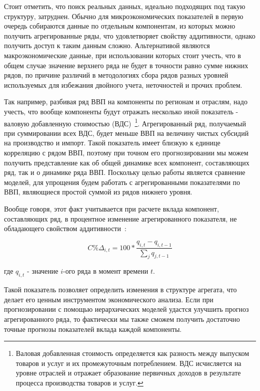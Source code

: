 \documentclass[12pt,a4paper, oneside]{extreport}
\begin{document}
Стоит отметить, что поиск реальных данных, идеально подходящих под такую структуру, затруднен. Обычно для микроэкономических показателей  в первую очередь собираются данные по отдельным компонентам, из которых  можно получить агрегированные ряды, что удовлетворяет свойству аддитивности, однако получить доступ к таким данным сложно. Альтернативой являются макроэкономические данные, при использовании которых стоит учесть, что в общем случае значение верхнего ряда не будет в точности  равно сумме нижних рядов, по причине различий в методологиях сбора рядов разных уровней используемых для   избежания двойного учета, неточностей и прочих проблем. 

Так например, разбивая ряд ВВП на компоненты по регионам и отраслям, надо учесть, что вообще компоненты будут отражать несколько иной показатель -  валовую добавленную стоимостью (ВДС)~\footnote{Валовая добавленная стоимость определяется как разность между выпуском товаров и услуг и их промежуточным потреблением. ВДС  исчисляется на уровне отраслей и отражает образование первичных доходов в результате процесса производства товаров и услуг.}. Агрегированный ряд, получаемый при суммировании всех ВДС, будет меньше ВВП на величину чистых субсидий на производство и импорт. Такой показатель имеет близкую к единице корреляцию с рядом ВВП, поэтому при точном его прогнозировании мы можем получить представление как об общей динамике всех компонент, составляющих ряд, так и о динамике ряда ВВП.  Поскольку целью работы является сравнение моделей, для упрощения будем работать с агрегированными показателями по ВВП, являющиеся простой суммой из рядов нижнего уровня. 


Вообще говоря, этот  факт учитывается при расчете вклада компонент, составляющих ряд, в процентное изменение агрегированного показателя, не обладающего свойством аддитивности~:  

\begin{equation}\label{key}
 C\% Δ_{i,t} = 100 * \dfrac{q_{i,t}-q_{i,t-1} }{\sum_j q_{j,t-1} } 
\end{equation}

где $q_{i,t}$ - значение $i$-ого ряда в момент времени $t$.

Такой показатель позволяет определить изменения в структуре агрегата, что делает его ценным инструментом экономического анализа.
Если при прогнозировании с помощью иерархических моделей удастся улучшить прогноз агрегированного ряда, то фактически мы также сможем получить достаточно точные прогнозы показателей вклада каждой компоненты.
\end{document}
